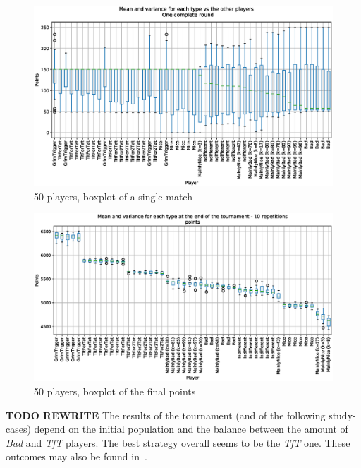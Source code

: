 \documentclass[journal,a4paper,10pt,twoside]{IEEEtran} %
\begin{document}
\begin{figure}[!ht]
    \centering
    \includegraphics[width=1\columnwidth]{../img/ipdmp/ipdmp-boxplot-single-match-50}
    \caption{50 players, boxplot of a single match}
    \label{fig:boxIPDMPsingle}
\end{figure}

\begin{figure}[!ht]
    \centering
    \includegraphics[width=1\columnwidth]{../img/ipdmp/ipdmp-boxplot-final-points-50}
    \caption{50 players, boxplot of the final points}
    \label{fig:boxIPDMPfinal}
\end{figure}

\textbf{TODO REWRITE}
The results of the tournament (and of the following study-cases) depend on the initial population and the balance between the amount of \textit{Bad} and \textit{TfT} players. The best strategy overall seems to be the \textit{TfT} one.
These outcomes may also be found in~\cite{mathieu2017}.
\end{document}
